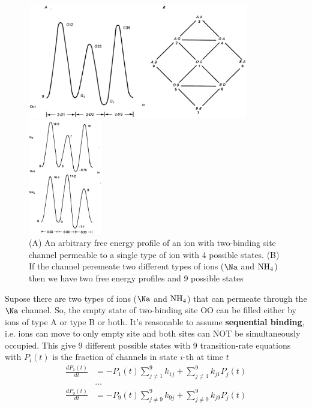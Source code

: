 \begin{figure}[hbt]

  \centerline{\includegraphics[height=5cm,
    angle=0]{./images/Eyring_2site-model.eps}}
  \centerline{\includegraphics[height=5cm,
    angle=0]{./images/Ina_energybarrier.eps}}
\caption{(A) An arbitrary free energy profile of an ion with two-binding site
channel permeable to a single type of ion with 4 possible states. (B) If the
channel peremeate two different types of ions ($\Na$ and $\ce{NH4}$) then we
have two free energy profiles and 9 possible states}
\label{fig:Ina_freenergy}
\end{figure}

Supose there are two types of ions ($\Na$ and $\ce{NH4}$) that can permeate
through the $\Na$ channel. So, the empty state of two-binding site OO can be
filled either by ions of type A or type B or both. It's reasonable to assume
{\bf sequential binding}, i.e. ions can move to only empty site and both sites
can NOT be simultaneously occupied. This give 9 different possible states with 
9 transition-rate equations with $P_i(t)$ is the fraction of channels in state
$i$-th at time $t$
\begin{equation}
\begin{split}
\frac{dP_1(t)}{dt} &= -P_1(t) \sum^9_{j\ne 1}k_{1j} + \sum^9_{j\ne 1}
k_{j1}P_j(t) \\ 
 &\ldots \\
\frac{dP_9(t)}{dt} &= -P_9(t) \sum^9_{j\ne 9}k_{9j} + \sum^9_{j\ne 9}
k_{j9}P_j(t) \\  
\end{split}
\end{equation}

